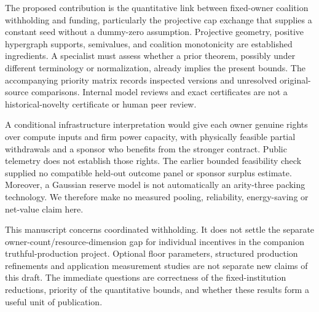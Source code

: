 The proposed contribution is the quantitative link between fixed-owner
coalition withholding and funding, particularly the projective cap exchange
that supplies a constant seed without a dummy-zero assumption. Projective
geometry, positive hypergraph supports, semivalues, and coalition monotonicity
are established ingredients. A specialist must assess whether a prior theorem,
possibly under different terminology or normalization, already implies the
present bounds. The accompanying priority matrix records inspected versions
and unresolved original-source comparisons. Internal model reviews and exact
certificates are not a historical-novelty certificate or human peer review.

A conditional infrastructure interpretation would give each owner genuine
rights over compute inputs and firm power capacity, with physically feasible
partial withdrawals and a sponsor who benefits from the stronger contract.
Public telemetry does not establish those rights. The earlier bounded
feasibility check supplied no compatible held-out outcome panel or sponsor
surplus estimate. Moreover, a Gaussian reserve model is not automatically an
arity-three packing technology. We therefore make no measured pooling,
reliability, energy-saving or net-value claim here.

This manuscript concerns coordinated withholding. It does not settle the
separate owner-count/resource-dimension gap for individual incentives in the
companion truthful-production project. Optional floor parameters, structured
production refinements and application measurement studies are not separate
new claims of this draft. The immediate questions are correctness of the
fixed-institution reductions, priority of the quantitative bounds, and whether
these results form a useful unit of publication.
